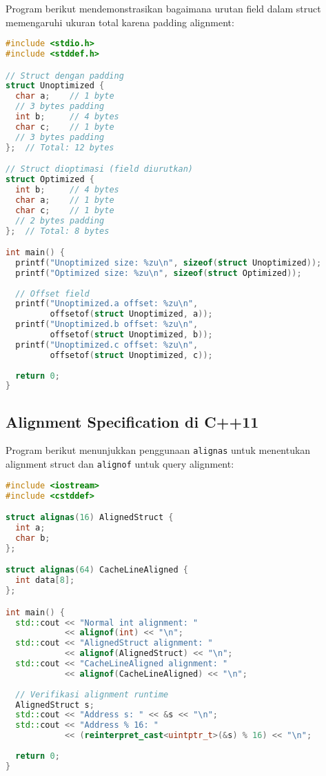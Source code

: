 \documentclass[../main.tex]{subfiles}
\begin{document}
Program berikut mendemonstrasikan bagaimana urutan field dalam struct memengaruhi ukuran total karena padding alignment:

\begin{lstlisting}[language=C, caption={Padding dalam struct}]
#include <stdio.h>
#include <stddef.h>

// Struct dengan padding
struct Unoptimized {
  char a;    // 1 byte
  // 3 bytes padding
  int b;     // 4 bytes
  char c;    // 1 byte
  // 3 bytes padding
};  // Total: 12 bytes

// Struct dioptimasi (field diurutkan)
struct Optimized {
  int b;     // 4 bytes
  char a;    // 1 byte
  char c;    // 1 byte
  // 2 bytes padding
};  // Total: 8 bytes

int main() {
  printf("Unoptimized size: %zu\n", sizeof(struct Unoptimized));
  printf("Optimized size: %zu\n", sizeof(struct Optimized));
  
  // Offset field
  printf("Unoptimized.a offset: %zu\n", 
         offsetof(struct Unoptimized, a));
  printf("Unoptimized.b offset: %zu\n", 
         offsetof(struct Unoptimized, b));
  printf("Unoptimized.c offset: %zu\n", 
         offsetof(struct Unoptimized, c));
  
  return 0;
}
\end{lstlisting}

\subsection{Alignment Specification di C++11}

Program berikut menunjukkan penggunaan \texttt{alignas} untuk menentukan alignment struct dan \texttt{alignof} untuk query alignment:

\begin{lstlisting}[language=C++, caption={alignas dan alignof di C++11}]
#include <iostream>
#include <cstddef>

struct alignas(16) AlignedStruct {
  int a;
  char b;
};

struct alignas(64) CacheLineAligned {
  int data[8];
};

int main() {
  std::cout << "Normal int alignment: " 
            << alignof(int) << "\n";
  std::cout << "AlignedStruct alignment: " 
            << alignof(AlignedStruct) << "\n";
  std::cout << "CacheLineAligned alignment: " 
            << alignof(CacheLineAligned) << "\n";
  
  // Verifikasi alignment runtime
  AlignedStruct s;
  std::cout << "Address s: " << &s << "\n";
  std::cout << "Address % 16: " 
            << (reinterpret_cast<uintptr_t>(&s) % 16) << "\n";
  
  return 0;
}
\end{lstlisting}
\end{document}
